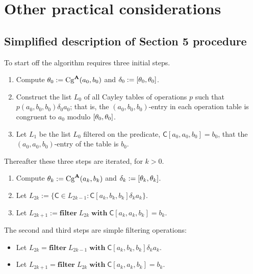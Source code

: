   \section{Other practical considerations}
  \subsection{Simplified description of Section 5 procedure}
  To start off the algorithm requires three initial steps.
  \begin{enumerate}
    \item Compute $\theta_0 := \operatorname{Cg}^{\mathbf{A}}(a_0, b_0)$ and $\delta_0 := [\theta_0, \theta_0]$.
    \item Construct the list $L_0$ of all Cayley tables of operations $p$
    such that $p(a_0, b_0, b_0) \mathrel{\delta_0} a_0$; that is, the
    $(a_0, b_0, b_0)$-entry in each operation table is congruent to $a_0$ modulo $[\theta_0, \theta_0]$.
    \item Let $L_1$ be the list $L_0$ filtered on the predicate,
    $\mathsf{C}[a_0, a_0, b_0] = b_0$, that the $(a_0, a_0, b_0)$-entry of
    the table is $b_0$.
  \end{enumerate}
  Thereafter these three steps are iterated, for $k> 0$.
  \begin{enumerate}
    \item Compute $\theta_{k} := \operatorname{Cg}^{\mathbf{A}}(a_k, b_k)$ and $\delta_{k} := [\theta_{k}, \theta_{k}]$.
    \item Let $L_{2k} := \{\mathsf{C} \in L_{2k-1} \colon \mathsf{C}[a_k, b_k, b_k] \mathrel{\delta_{k}} a_k \}$.
    \item Let $L_{2k+1} := \mathbf{filter} \; L_{2k} \; \mathbf{with} \; \mathsf{C}[a_k, a_k, b_k] = b_k$.
  \end{enumerate}
  The second and third steps are simple filtering operations:
  \begin{itemize}
    \item Let $L_{2k} = \mathbf{filter}\; L_{2k-1} \; \mathbf{with} \; \mathsf{C}[a_k, b_k, b_k] \mathrel{\delta_{k}} a_k$.
    \item Let $L_{2k+1} = \mathbf{filter} \; L_{2k} \; \mathbf{with} \; \mathsf{C}[a_k, a_k, b_k] = b_k$.
  \end{itemize}


